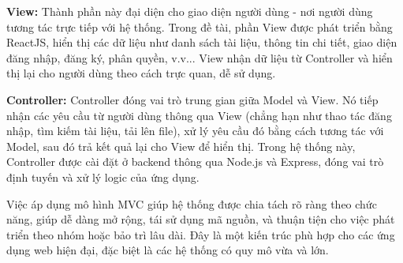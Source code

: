 \documentclass{article}
\begin{document}
	\textbf{View:} Thành phần này đại diện cho giao diện người dùng - nơi người dùng tương tác trực tiếp với hệ thống. Trong đề tài, phần View được phát triển bằng ReactJS, hiển thị các dữ liệu như danh sách tài liệu, thông tin chi tiết, giao diện đăng nhập, đăng ký, phân quyền, v.v... View nhận dữ liệu từ Controller và hiển thị lại cho người dùng theo cách trực quan, dễ sử dụng.
	
	\textbf{Controller:} Controller đóng vai trò trung gian giữa Model và View. Nó tiếp nhận các yêu cầu từ người dùng thông qua View (chẳng hạn như thao tác đăng nhập, tìm kiếm tài liệu, tải lên file), xử lý yêu cầu đó bằng cách tương tác với Model, sau đó trả kết quả lại cho View để hiển thị. Trong hệ thống này, Controller được cài đặt ở backend thông qua Node.js và Express, đóng vai trò định tuyến và xử lý logic của ứng dụng.
	
	Việc áp dụng mô hình MVC giúp hệ thống được chia tách rõ ràng theo chức năng, giúp dễ dàng mở rộng, tái sử dụng mã nguồn, và thuận tiện cho việc phát triển theo nhóm hoặc bảo trì lâu dài. Đây là một kiến trúc phù hợp cho các ứng dụng web hiện đại, đặc biệt là các hệ thống có quy mô vừa và lớn.
\end{document}

